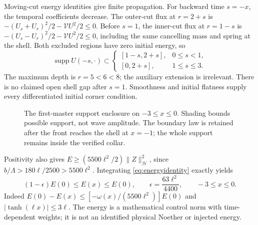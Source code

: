 \documentclass[11pt]{article}
\newcommand{\norm}[1]{\lVert #1\rVert}
\newcommand{\HH}{\mathcal H}
\begin{document}
Moving-cut energy identities give finite propagation. For backward time
$s=-x$, the temporal coefficients decrease.
The outer-cut flux at $r=2+s$ is
$-(U_s+U_r)^2/2-\mathcal VU^2/2\le0$.
Before $s=1$, the inner-cut flux at $r=1-s$ is
$-(U_s-U_r)^2/2-\mathcal VU^2/2\le0$, including the same cancelling
mass and spring at the shell. Both excluded regions have zero initial
energy, so
\begin{equation}
 \operatorname{supp}U(-s,\cdot)\subset
 \begin{cases}
 [1-s,2+s],&0\le s<1,\\
 [0,2+s],&1\le s\le3.
 \end{cases}
 \label{eq:support}
\end{equation}
The maximum depth is $r=5<6<8$; the auxiliary extension is irrelevant.
There is no claimed open shell gap after $s=1$. Smoothness and initial
flatness supply every differentiated initial corner condition.

\begin{figure}[htbp]
\centering
{}
\caption{The first-master support enclosure on $-3\le x\le0$.
Shading bounds possible support, not wave amplitude.
The boundary law is retained after the front reaches the shell at $x=-1$;
the whole support remains inside the verified collar.}
\label{fig:support}
\end{figure}

Positivity also gives
$E\ge(5500\ell^2/2)\norm{Z}_{\HH}^2$, since
$b/\Lambda>180\ell/2500>5500\ell^2$. Integrating
\eqref{eq:energyidentity} exactly yields
\begin{equation}
 (1-\epsilon)E(0)\le E(x)\le E(0),\qquad
 \epsilon=\frac{63\ell^2}{4400},\qquad -3\le x\le0.
 \label{eq:almost}
\end{equation}
Indeed $E(0)-E(x)\le[-\omega(x)/(5500\ell^2)]E(0)$ and
$|\tanh(\ell x)|\le3\ell$. The energy is a mathematical control norm
with time-dependent weights; it is not an identified physical Noether
or injected energy.
\end{document}
